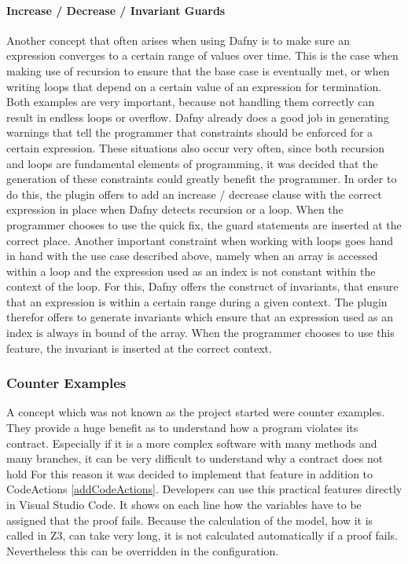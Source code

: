 \paragraph{Increase / Decrease / Invariant Guards}
Another concept that often arises when using Dafny is to make sure an expression converges to a certain range of values over time. This is the case when making use of recursion to ensure that the base case is eventually met, or when writing loops that depend on a certain value of an expression for termination. Both examples are very important, because not handling them correctly can result in endless loops or overflow. Dafny already does a good job in generating warnings that tell the programmer that constraints should be enforced for a certain expression. \newline
These situations also occur very often, since both recursion and loops are fundamental elements of programming, it was decided that the generation of these constraints could greatly benefit the programmer. In order to do this, the plugin offers to add an increase / decrease clause with the correct expression in place when Dafny detects recursion or a loop. When the programmer chooses to use the quick fix, the guard statements are inserted at the correct place. Another important constraint when working with loops goes hand in hand with the use case described above, namely when an array is accessed within a loop and the expression used as an index is not constant within the context of the loop. For this, Dafny offers the construct of invariants, that ensure that an expression is within a certain range during a given context. The plugin therefor offers to generate invariants which ensure that an expression used as an index is always in bound of the array. When the programmer chooses to use this feature, the invariant is inserted at the correct context. 
\subsubsection{Counter Examples}
A concept which was not known as the project started were counter examples. They provide a huge benefit as to understand how a program violates its contract. Especially if it is a more complex software with many methods and many branches, it can be very difficult to understand why a contract does not hold\newline
For this reason it was decided to implement that feature in addition to CodeActions \ref{addCodeActions}. 
Developers can use this practical features directly in Visual Studio Code. It shows on each line how the variables have to be assigned that the proof fails. \newline
Because the calculation of the model, how it is called in Z3, can take very long, it is not calculated automatically if a proof fails. Nevertheless this can be overridden in the configuration. 
